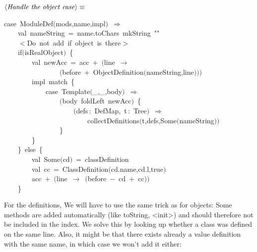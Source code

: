 \documentclass[a4paper,12pt]{article}
\begin{document}
$\left<\mbox{\emph{Handle the object case}}\right>\equiv$
\begin{program}{\vem case}~ModuleDef$($mods,name,impl$)$~$\Rightarrow$
\\~~~~{\vem val}~nameString~=~name.toChars~mkString~""
\\~~~~$<$Do~not~add~{\vem if}~{\vem object}~is~there$>$
\\~~~~{\vem if}$($isRealObject$)$~{\small\{}
\\~~~~~~~~{\vem val}~newAcc~=~acc~$+$~$($line~$\rightarrow$
\\~~~~~~~~~~~~~~~~$($before~$+$~ObjectDefinition$($nameString,line$)$$)$$)$
\\~~~~~~~~impl~{\vem match}~{\small\{}
\\~~~~~~~~~~~~{\vem case}~Template$($\_,\_,body$)$~$\Rightarrow$
\\~~~~~~~~~~~~~~~~$($body~foldLeft~newAcc$)$~{\small\{}
\\~~~~~~~~~~~~~~~~~~~~$($defs\,{\rm :}~DefMap,~t\,{\rm :}~Tree$)$~$\Rightarrow$
\\~~~~~~~~~~~~~~~~~~~~~~~~collectDefinitions$($t,defs,Some$($nameString$)$$)$
\\~~~~~~~~~~~~~~~~{\small\}}
\\~~~~~~~~{\small\}}
\\~~~~{\small\}}~{\vem else}~{\small\{}
\\~~~~~~~~{\vem val}~Some$($cd$)$~=~classDefinition
\\~~~~~~~~{\vem val}~cc~=~ClassDefinition$($cd.name,cd.l,{\vem true}$)$
\\~~~~~~~~acc~$+$~$($line~$\rightarrow$~$($before~$-$~cd~$+$~cc$)$$)$
\\~~~~{\small\}}
\\[0.5em]\end{program}


For the definitions, We will have to use the same trick as for objects: Some
methods are added automatically (like toString, <init>) and should therefore not
be included in the index. We solve this by looking up whether a class was defined
on the same line. Also, it might be that there exists already a value definition with
the same name, in which case we won't add it either:
\end{document}
